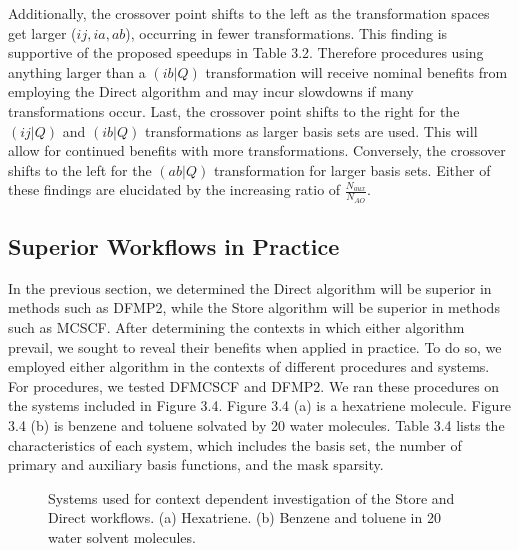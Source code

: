 Additionally, the crossover point shifts to the left as the transformation spaces get larger ($ij, ia, ab$), occurring in fewer transformations.
This finding is supportive of the proposed speedups in Table 3.2.
Therefore procedures using anything larger than a $(ib|Q)$ transformation will receive nominal benefits from employing the 
Direct algorithm and may incur slowdowns if many transformations occur.
Last, the crossover point shifts to the right for the $(ij|Q)$ and $(ib|Q)$ transformations as larger basis sets are used. 
This will allow for 
continued benefits with more transformations. Conversely, the crossover shifts to the left for the $(ab|Q)$ transformation
for larger basis sets. Either of these findings are elucidated
by the increasing ratio of $\frac{N_{aux}}{N_{AO}}$. 
 

\subsection{Superior Workflows in Practice}

In the previous section, we determined the Direct algorithm will be superior in methods such as DFMP2, while the Store 
algorithm will be superior in methods such as MCSCF.
After determining the contexts in which either algorithm prevail, we sought to reveal their benefits when applied in practice. 
To do so, we employed either algorithm
in the contexts of different procedures and systems. For procedures, we tested DFMCSCF and DFMP2. We ran these 
procedures on the systems included in Figure 3.4.
Figure 3.4 (a) is a hexatriene molecule. Figure 3.4 (b) is benzene and toluene solvated by 20 water molecules.
Table 3.4 lists the characteristics of each system,
which includes the basis set, the number of primary and auxiliary basis functions, and the mask sparsity. 


\begin{figure}[H]
  \captionsetup[subfigure]{}
  \centering
  \hfill
  \caption{Systems used for context dependent investigation of the Store and Direct workflows. (a) Hexatriene. (b) Benzene and toluene 
in 20 water solvent molecules. }
\end{figure}

